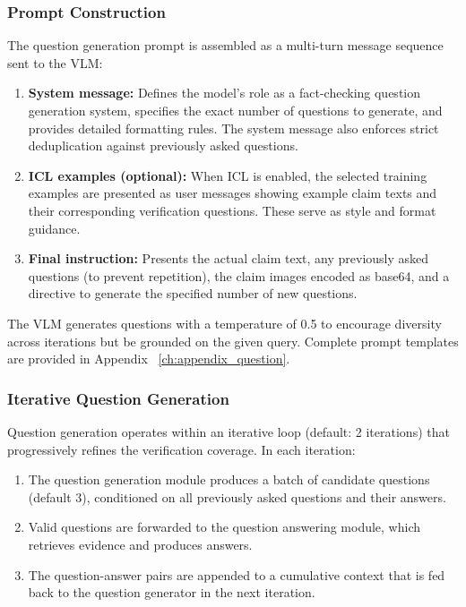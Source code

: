 \subsubsection{Prompt Construction}

The question generation prompt is assembled as a multi-turn message sequence sent to the VLM:

\begin{enumerate}
    \item \textbf{System message:} Defines the model's role as a fact-checking question generation system, specifies the exact number of questions to generate, and provides detailed formatting rules. The system message also enforces strict deduplication against previously asked questions.
    \item \textbf{ICL examples (optional):} When ICL is enabled, the selected training examples are presented as user messages showing example claim texts and their corresponding verification questions. These serve as style and format guidance. 
    \item \textbf{Final instruction:} Presents the actual claim text, any previously asked questions (to prevent repetition), the claim images encoded as base64, and a directive to generate the specified number of new questions.
\end{enumerate}

The VLM generates questions with a temperature of 0.5 to encourage diversity across iterations but be grounded on the given query. Complete prompt templates are provided in Appendix ~\ref{ch:appendix_question}.

\subsubsection{Iterative Question Generation}

Question generation operates within an iterative loop (default: 2 iterations) that progressively refines the verification coverage. In each iteration:

\begin{enumerate}
    \item The question generation module produces a batch of candidate questions (default 3), conditioned on all previously asked questions and their answers.
    \item Valid questions are forwarded to the question answering module, which retrieves evidence and produces answers.
    \item The question-answer pairs are appended to a cumulative context that is fed back to the question generator in the next iteration.
\end{enumerate}

